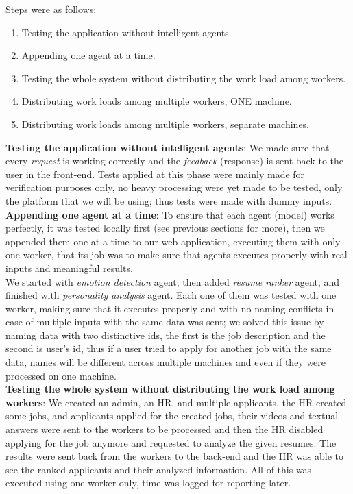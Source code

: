Steps were as follows:
\begin{enumerate}
    \item Testing the application without intelligent agents.
    \item Appending one agent at a time.
    \item Testing the whole system without distributing the work load among workers.
    \item Distributing work loads among multiple workers, ONE machine.
    \item Distributing work loads among multiple workers, separate machines.
\end{enumerate}


\textbf{Testing the application without intelligent agents}: We made sure that every \textit{request} is working correctly and the \textit{feedback} (response) is sent back to the user in the front-end. Tests applied at this phase were mainly made for verification purposes only, no heavy processing were yet made to be tested, only the platform that we will be using; thus tests were made with dummy inputs.\\

\textbf{Appending one agent at a time}: To ensure that each agent (model) works perfectly, it was tested locally first (see previous sections for more), then we appended them one at a time to our web application, executing them with only one worker, that its job was to make sure that agents executes properly with real inputs and  meaningful results.\\
We started with \textit{emotion detection} agent, then added \textit{resume ranker} agent, and finished with \textit{personality analysis} agent. Each one of them was tested with one worker, making sure that it executes properly and with no naming conflicts in case of multiple inputs with the same data was sent; we solved this issue by naming data with two distinctive ids, the first is the job description and the second is user's id, thus if a user tried to apply for another job with the same data, names will be different across multiple machines and even if they were processed on one machine.\\

\textbf{Testing the whole system without distributing the work load among workers}: We created an admin, an HR, and multiple applicants, the HR created some jobs, and applicants applied for the created jobs, their videos and textual answers were sent to the workers to be processed and then the HR disabled applying for the job anymore and requested to analyze the given resumes. The results were sent back from the workers to the back-end and the HR was able to see the ranked applicants and their analyzed information. All of this was executed using one worker only, time was logged for reporting later.\\

